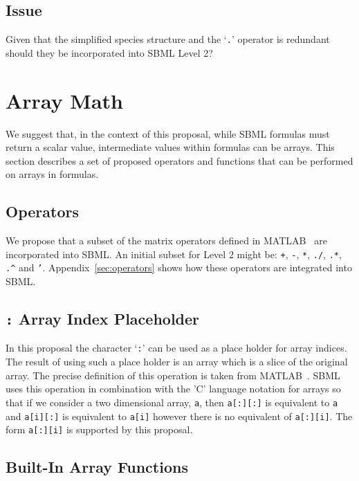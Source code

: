 \documentclass{cekarticle}
\begin{document}
\subsection{Issue}

Given that the simplified species structure and the `\texttt{.}'
operator is redundant should they be incorporated into SBML Level 2?

\section{Array Math}
\label{sec:math}

We suggest that, in the context of this proposal, while SBML
formulas must return a scalar value, intermediate values within
formulas can be arrays.  This section describes a set of proposed
operators and functions that can be performed on arrays in
formulas.

\subsection{Operators}

We propose that a subset of the matrix operators defined in
MATLAB~\citep{matlab:1998} are incorporated into SBML. An initial
subset for Level 2 might be: \texttt{+}, \texttt{-}, \texttt{*},
\texttt{./}, \texttt{.*}, \verb+.^+ and \texttt{'}.
Appendix~\ref{sec:operators} shows how these operators are
integrated into SBML.

\subsection{\texttt{:} Array Index Placeholder}

In this proposal the character `\texttt{:}' can be used as a
place holder for array indices.  The result of using such a place
holder is an array which is a slice of the original array. The
precise definition of this operation is taken from
MATLAB~\citep{matlab:1998}.  SBML uses this operation in
combination with the 'C' language notation for arrays so that if
we consider a two dimensional array, \texttt{a}, then
\texttt{a[:][:]} is equivalent to \texttt{a} and \texttt{a[i][:]}
is equivalent to \texttt{a[i]} however there is no equivalent of
\texttt{a[:][i]}.  The form \texttt{a[:][i]} is supported by this
proposal.

\subsection{Built-In Array Functions}
\end{document}
